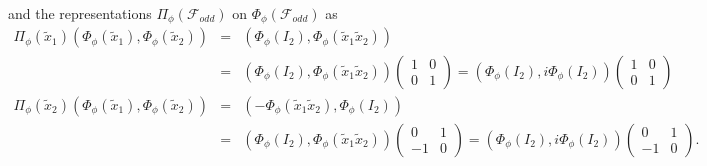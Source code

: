 \documentclass[aps,preprint]{revtex4}
\begin{document}
and the representations $\Pi _{\phi }\left( \mathcal{F}_{odd}\right) $ on $%
\Phi _{\phi }\left( \mathcal{F}_{odd}\right) $ as%
\begin{eqnarray}
\Pi _{\phi }\left( \widetilde{x}_{1}\right) \left( \Phi _{\phi }\left( 
\widetilde{x}_{1}\right) ,\Phi _{\phi }\left( \widetilde{x}_{2}\right)
\right) &=&\left( \Phi _{\phi }\left( I_{2}\right) ,\Phi _{\phi }\left( 
\widetilde{x}_{1}\widetilde{x}_{2}\right) \right) \\
&=&\left( \Phi _{\phi }\left( I_{2}\right) ,\Phi _{\phi }\left( \widetilde{x}%
_{1}\widetilde{x}_{2}\right) \right) \left( 
\begin{array}{cc}
1 & 0 \\ 
0 & 1%
\end{array}%
\right) =\left( \Phi _{\phi }\left( I_{2}\right) ,i\Phi _{\phi }\left(
I_{2}\right) \right) \left( 
\begin{array}{cc}
1 & 0 \\ 
0 & 1%
\end{array}%
\right) \\
\Pi _{\phi }\left( \widetilde{x}_{2}\right) \left( \Phi _{\phi }\left( 
\widetilde{x}_{1}\right) ,\Phi _{\phi }\left( \widetilde{x}_{2}\right)
\right) &=&\left( -\Phi _{\phi }\left( \widetilde{x}_{1}\widetilde{x}%
_{2}\right) ,\Phi _{\phi }\left( I_{2}\right) \right) \\
&=&\left( \Phi _{\phi }\left( I_{2}\right) ,\Phi _{\phi }\left( \widetilde{x}%
_{1}\widetilde{x}_{2}\right) \right) \left( 
\begin{array}{cc}
0 & 1 \\ 
-1 & 0%
\end{array}%
\right) =\left( \Phi _{\phi }\left( I_{2}\right) ,i\Phi _{\phi }\left(
I_{2}\right) \right) \left( 
\begin{array}{cc}
0 & 1 \\ 
-1 & 0%
\end{array}%
\right) .
\end{eqnarray}
\end{document}
